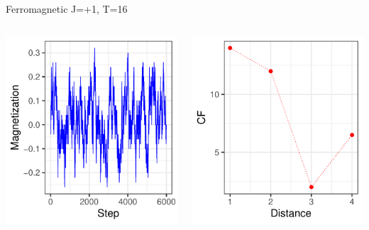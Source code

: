 \documentclass{beamer}
\begin{document}
\begin{frame}{Ferromagnetic J=+1, T=16}
\begin{columns}
\begin{column}{0.5\textwidth}
    \begin{center}
     \includegraphics[width=\textwidth]{Pic/J+1_10_2500_T=16_Magnetization.pdf}
     \end{center}
\end{column}
\begin{column}{0.5\textwidth}
    \begin{center}
     \includegraphics[width=\textwidth]{Pic/J+1_10_2500_T=16_Coherence.pdf}

\end{center}
\end{column}
\end{columns}
\end{frame}
\end{document}
